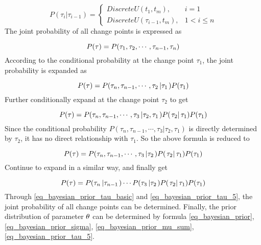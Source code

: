 \documentclass{svjour3}                     %
\begin{document}
\begin{equation}\label{eq_bayesian_prior_tau_basic}
P({\tau _i}\left| {{\tau _{i - 1}}} \right.) = \left\{ {\begin{array}{*{20}{r}}
	{DiscreteU({t_1},{t_m}),}&{i = 1}\\
	{DiscreteU({\tau _{i - 1}},{t_m}),}&{1 < i \le n}
	\end{array}} \right.
\end{equation}
The joint probability of all change points is expressed as

\begin{equation}\label{eq_bayesian_prior_tau_1}
P({\bf{\tau }}) = P({\tau _1},{\tau _2}, \cdots ,{\tau _{n - 1}},{\tau _n})
\end{equation}
According to the conditional probability at the change point ${\tau _1}$, the joint probability is expanded as

\begin{equation}\label{eq_bayesian_prior_tau_2}
P({\bf{\tau }}) = P({\tau _n},{\tau _{n - 1}}, \cdots ,{\tau _2}\left| {{\tau _1}} \right.)P({\tau _1})
\end{equation}
Further conditionally expand at the change point ${\tau _2}$ to get

\begin{equation}\label{eq_bayesian_prior_tau_3}
P({\bf{\tau }}) = P({\tau _n},{\tau _{n - 1}}, \cdots ,{\tau _3}\left| {{\tau _2},{\tau _1}} \right.)P(\left. {{\tau _2}} \right|{\tau _1})P({\tau _1})
\end{equation}
Since the conditional probability $P({\tau _n},{\tau _{n - 1}}, \cdots ,{\tau _3}\left| {{\tau _2},{\tau _1}} \right.)$ is directly determined by ${\tau _2}$, it has no direct relationship with ${\tau _1}$. So the above formula is reduced to

\begin{equation}\label{eq_bayesian_prior_tau_4}
P({\bf{\tau }}) = P({\tau _n},{\tau _{n - 1}}, \cdots ,{\tau _3}\left| {{\tau _2}} \right.)P(\left. {{\tau _2}} \right|{\tau _1})P({\tau _1})
\end{equation}
Continue to expand in a similar way, and finally get

\begin{equation}\label{eq_bayesian_prior_tau_5}
P({\bf{\tau }}) = P({\tau _n}\left| {{\tau _{n - 1}}} \right.) \cdots P({\tau _3}\left| {{\tau _2}} \right.)P(\left. {{\tau _2}} \right|{\tau _1})P({\tau _1})
\end{equation}
Through \ref{eq_bayesian_prior_tau_basic} and \ref{eq_bayesian_prior_tau_5}, the joint probability of all change points can be determined. Finally, the prior distribution of parameter ${\bf{\theta }}$ can be determined by formula \ref{eq_bayesian_prior}, \ref{eq_bayesian_prior_sigma}, \ref{eq_bayesian_prior_mu_sum}, \ref{eq_bayesian_prior_tau_5}.
\end{document}

